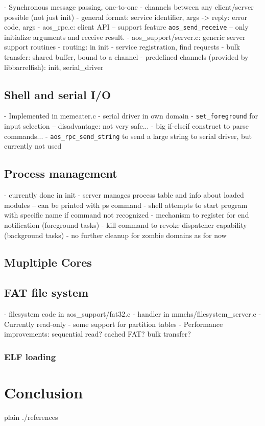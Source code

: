 \documentclass[a4paper,10pt]{article}
\begin{document}
- Synchronous message passing, one-to-one
- channels between any client/server possible (not just init)
- general format: service identifier, args -> reply: error code, args
- aos\_rpc.c: client API
-- support feature \lstinline!aos_send_receive!
-- only initialize arguments and receive result.
- aos\_support/server.c: generic server support routines
- routing: in init - service registration, find requests
- bulk transfer: shared buffer, bound to a channel
- predefined channels (provided by libbarrelfish): init, serial\_driver

\subsection{Shell and serial I/O}
- Implemented in memeater.c
- serial driver in own domain
- \lstinline!set_foreground! for input selection
-- disadvantage: not very safe...
- big if-elseif construct to parse commands...
- \lstinline!aos_rpc_send_string! to send a large string to serial driver, but currently not used

\subsection{Process management}
- currently done in init
- server manages process table and info about loaded modules
-- can be printed with ps command
- shell attempts to start program with specific name if command not recognized
- mechanism to register for end notification (foreground tasks)
- kill command to revoke dispatcher capability (background tasks)
- no further cleanup for zombie domains as for now

\subsection{Mupltiple Cores}

\todo {}

\subsection{FAT file system}
- filesystem code in aos\_support/fat32.c
- handler in mmchs/filesystem\_server.c
- Currently read-only
- some support for partition tables
- Performance improvements: sequential read? cached FAT? bulk transfer?

\subsubsection{ ELF loading}


\section{Conclusion}

\begin{flushleft}
{{{
 {plain}
 {./references}
}}}
\end{flushleft}


\todos
\end{document}
